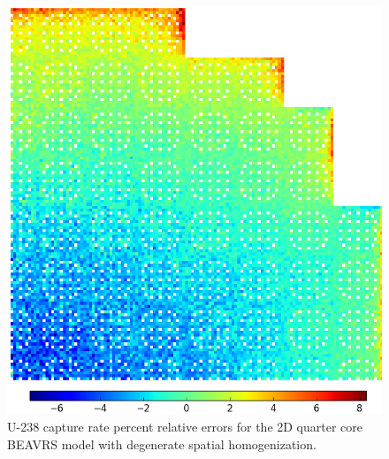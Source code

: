 \begin{figure}[h!]
\centering
\includegraphics[width=\linewidth]{figures/patterns/lns/full-core/capt-err-degenerate}
\vspace{2mm}
\caption[U-238 capture rate absolute errors for \ac{BEAVRS} with degenerate homogenization]{U-238 capture rate percent relative errors for the 2D quarter core \ac{BEAVRS} model with degenerate spatial homogenization.}
\label{fig:chap9-full-core-capt-err-degenerate}
\end{figure}

\clearpage


